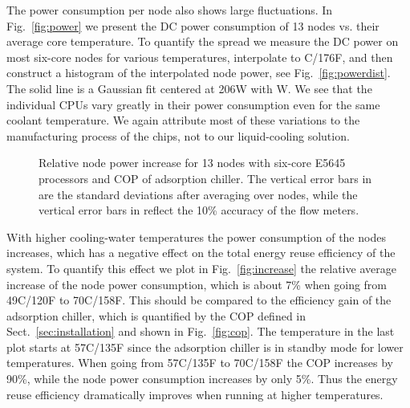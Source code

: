 The power consumption per node also shows large fluctuations.  In
Fig.~\ref{fig:power} we present the DC power consumption of 13 nodes
vs.{} their average core temperature.  To quantify the spread we
measure the DC power on most six-core nodes for various temperatures,
interpolate to C/176F, and then construct a
histogram of the interpolated node power, see
Fig.~\ref{fig:powerdist}.  The solid line is a Gaussian fit centered
at 206W with W.  We see that the individual CPUs vary
greatly in their power consumption even for the same coolant
temperature.  We again attribute most of these variations to the
manufacturing process of the chips, not to our liquid-cooling
solution.

\begin{figure}
  \centering
  \hfill
  \hfill
  \vspace*{-3mm}
  \caption{ Relative node power increase for 13
    nodes with six-core E5645 processors and  COP of
    adsorption chiller.  The vertical error bars in
     are the standard deviations after averaging
    over nodes, while the vertical error bars in 
    reflect the 10\% accuracy of the flow meters.}
\end{figure}

With higher cooling-water temperatures the power consumption of the
nodes increases, which has a negative effect on the total energy reuse
efficiency of the system.  To quantify this effect we plot in
Fig.~\ref{fig:increase} the relative average increase of the node
power consumption, which is about 7\% when going from
49C/120F to 70C/158F.  This should be
compared to the efficiency gain of the adsorption chiller, which is
quantified by the COP defined in Sect.~\ref{sec:installation} and
shown in Fig.~\ref{fig:cop}.  The temperature in the last plot starts
at 57C/135F since the adsorption chiller is in standby
mode for lower temperatures.  When going from 57C/135F
to 70C/158F the COP increases by 90\%, while the node
power consumption increases by only 5\%.  Thus the energy reuse
efficiency dramatically improves when running at higher temperatures.

